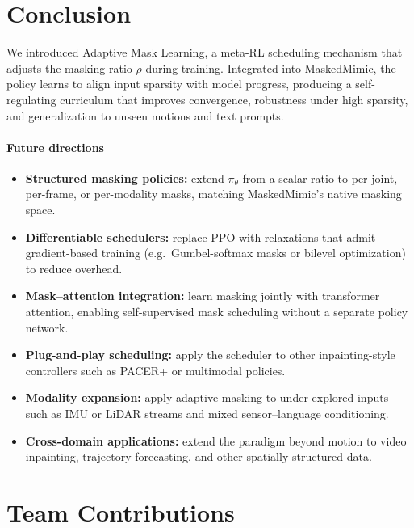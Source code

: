 \documentclass[10pt,letterpaper]{article}
\newcommand{\pth}{\pi_{\theta}}
\begin{document}
\section{Conclusion}
\label{sec:conclusion}

We introduced Adaptive Mask Learning, a meta-RL scheduling mechanism that adjusts the masking ratio $\rho$ during training. Integrated into MaskedMimic, the policy learns to align input sparsity with model progress, producing a self-regulating curriculum that improves convergence, robustness under high sparsity, and generalization to unseen motions and text prompts.

\paragraph{Future directions}
\begin{itemize}
  \item \textbf{Structured masking policies:} extend $\pth$ from a scalar ratio to per-joint, per-frame, or per-modality masks, matching MaskedMimic's native masking space.
  \item \textbf{Differentiable schedulers:} replace PPO with relaxations that admit gradient-based training (e.g.\ Gumbel-softmax masks or bilevel optimization) to reduce overhead.
  \item \textbf{Mask--attention integration:} learn masking jointly with transformer attention, enabling self-supervised mask scheduling without a separate policy network.
  \item \textbf{Plug-and-play scheduling:} apply the scheduler to other inpainting-style controllers such as PACER+ or multimodal policies.
  \item \textbf{Modality expansion:} apply adaptive masking to under-explored inputs such as IMU or LiDAR streams and mixed sensor--language conditioning.
  \item \textbf{Cross-domain applications:} extend the paradigm beyond motion to video inpainting, trajectory forecasting, and other spatially structured data.
\end{itemize}

\section{Team Contributions}
\end{document}

